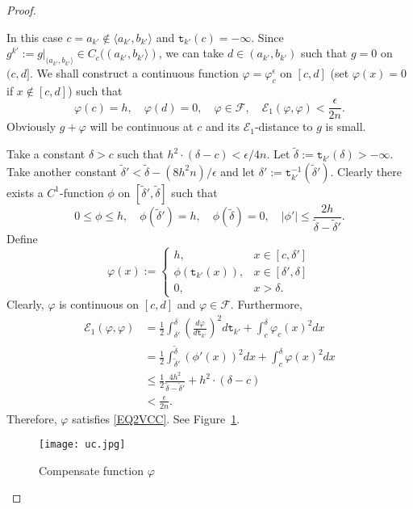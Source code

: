 \documentclass[a4paper]{amsart}
\theoremstyle{definition}
\theoremstyle{remark}
\numberwithin{equation}{section}
\begin{document}
\begin{proof}
\begin{itemize}
\begin{itemize}
In this case $c=a_{k'}\notin \langle a_{k'},b_{k'}\rangle$ and ${{\mathtt{t}}}_{k'}(c)=-\infty$. Since $g^{k'}:=g|_{( a_{k'},b_{k'}\rangle}\in C_c((a_{k'},b_{k'}\rangle)$, we can take $d\in (a_{k'}, b_{k'})$ such that $g=0$ on $(c, d]$.  We shall construct a continuous function $\varphi=\varphi_c^\epsilon$ on $[c, d]$ (set $\varphi(x)=0$ if $x\notin [c,d]$) such that
\begin{equation}\label{EQ2VCC}
\varphi(c)=h, \quad \varphi(d)=0,\quad \varphi \in {{\mathcal{F}}},\quad {{\mathcal{E}}}_1(\varphi, \varphi)<\frac{\epsilon}{2n}.
\end{equation}
Obviously $g+\varphi$ will be continuous at $c$ and its ${{\mathcal{E}}}_1$-distance to $g$ is small.

Take a constant $\delta>c$ such that $h^2\cdot (\delta-c)<\epsilon/4n$. Let $\tilde{\delta}:={{\mathtt{t}}}_{k'}(\delta)>-\infty$. Take another constant $\tilde{\delta}'<\tilde{\delta}-(8h^2n)/\epsilon$ and let $\delta':={{\mathtt{t}}}_{k'}^{-1}(\tilde{\delta}')$. Clearly there exists a $C^1$-function $\phi$ on $[\tilde{\delta}', \tilde{\delta}]$ such that
\[
	0\leq \phi \leq h,\quad \phi(\tilde{\delta}')=h,\quad   \phi(\tilde{\delta})=0,\quad |\phi'|\leq \frac{2h}{\tilde{\delta}-\tilde{\delta}'}.
\]
Define $$\varphi(x):=\begin{cases}h, & x\in [c, \delta']\\
\phi({{\mathtt{t}}}_{k'}(x)),& x\in [\delta', \delta]\\
0,&x>\delta. \end{cases}$$
Clearly, $\varphi$ is continuous on $[c,d]$ and $\varphi\in {{\mathcal{F}}}$. Furthermore,
\[
\begin{aligned}
	{{\mathcal{E}}}_1(\varphi,\varphi)&=\frac{1}{2}\int_{\delta'}^{\delta}\left( \frac{d\varphi}{d{{\mathtt{t}}}_{k'}}\right)^2d{{\mathtt{t}}}_{k'}+\int_c^\delta \varphi_c(x)^2dx\\
	&=\frac{1}{2}\int_{\tilde{\delta}'}^{\tilde{\delta}}\left(\phi'(x)\right)^2dx+\int_c^\delta \varphi(x)^2dx \\
	&\leq \frac{1}{2}\frac{4h^2}{\tilde{\delta}-\tilde{\delta}'} + h^2\cdot(\delta-c) \\
	&<\frac{\epsilon}{2n}.
\end{aligned}\]
Therefore, $\varphi$ satisfies \eqref{EQ2VCC}. See Figure~\ref{UC}.
\begin{figure}
\centering
\texttt{[image: uc.jpg]}
\caption{Compensate function $\varphi$}\label{UC}
\end{figure}


\end{itemize}
\end{itemize}
\end{proof}
\end{document}

